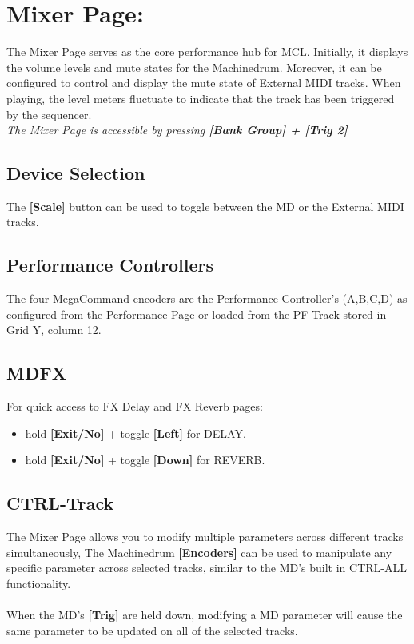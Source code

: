 \chapter{Mixer Page:}
The Mixer Page serves as the core performance hub for MCL. Initially, it displays the volume levels and mute states for the Machinedrum. Moreover, it can be configured to control and display the mute state of External MIDI tracks. When playing, the level meters fluctuate to indicate that the track has been triggered by the sequencer.
\\
\textit{The Mixer Page is accessible by pressing \textbf{[Bank Group] + [Trig 2]}}

\section{Device Selection}
The \textbf{[Scale]} button can be used to toggle between the MD or the External MIDI tracks.
\newpage
\section{Performance Controllers}
The four MegaCommand encoders are the Performance Controller's (A,B,C,D) as configured from the Performance Page or loaded from the PF Track stored in Grid Y, column 12.
\section{MDFX}
For quick access to FX Delay and FX Reverb pages:
\begin{itemize}
    \item hold \textbf{[Exit/No]} + toggle \textbf{[Left]} for DELAY.
    \item hold \textbf{[Exit/No]} + toggle \textbf{[Down]} for REVERB.
\end{itemize}
\section{CTRL-Track}
The Mixer Page allows you to modify multiple parameters across different tracks simultaneously,
The Machinedrum \textbf{[Encoders]} can be used to manipulate any specific parameter across selected tracks, similar to the MD's built in CTRL-ALL functionality.\\\\
When the MD's  \textbf{[Trig]} are held down, modifying a MD parameter will cause the same parameter to be updated on all of the selected tracks.
